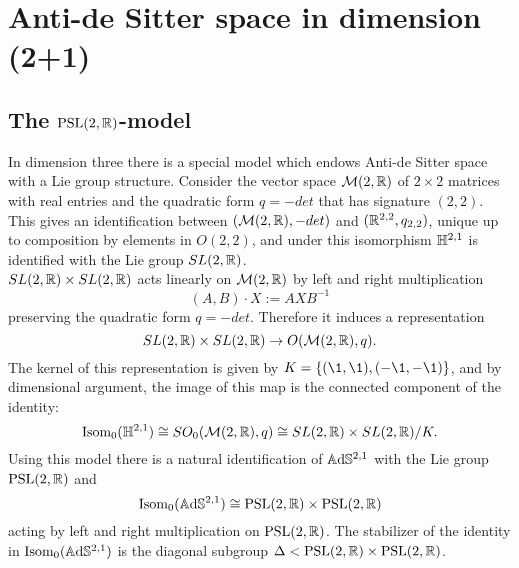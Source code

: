 \chapter{Anti-de Sitter space in dimension (2+1)} \label{chapter:3}

\section{The $\text{PSL}(2,\mathbb{R})$-model}
In dimension three there is a special model which endows Anti-de Sitter space with a Lie group structure.
Consider the vector space $\mathcal{M}(2,\mathbb{R})$ of $2 \times 2$ matrices with real entries and the quadratic form $q= -det$ that has signature $(2,2)$.
This gives an identification between $(\mathcal{M}(2,\mathbb{R}), -det)$ and $(\mathbb{R}^{2,2},q_{2,2})$, unique up to composition by elements in $O(2,2)$, and under this isomorphism $\mathbb{H}^{2,1}$ is identified with the Lie group $SL(2,\mathbb{R})$.\\
$SL(2,\mathbb{R})\times SL(2,\mathbb{R})$ acts linearly on $\mathcal{M}(2,\mathbb{R})$ by left and right multiplication
\[
    (A,B) \cdot X := AXB^{-1}    
\]
preserving the quadratic form $q = -det$. Therefore it induces a representation
\[
    SL(2,\mathbb{R})\times SL(2,\mathbb{R}) \to O(\mathcal{M}(2,\mathbb{R}),q).
\]
The kernel of this representation is given by $K=\{ (\1,\1),(-\1,-\1) \}$, and by dimensional argument, the image of this map is the connected component of the identity:
\[
    \text{Isom}_0(\mathbb{H}^{2,1}) \cong SO_0(\mathcal{M}(2,\mathbb{R}),q) \cong SL(2,\mathbb{R})\times SL(2,\mathbb{R}) / K.
\]
Using this model there is a natural identification of $\mathbb{A}\mathrm{d}\mathbb{S}^{2,1}$ with the Lie group $\text{PSL}(2,\mathbb{R})$ and
\[
    \text{Isom}_0(\mathbb{A}\mathrm{d}\mathbb{S}^{2,1}) \cong \text{PSL}(2,\mathbb{R}) \times \text{PSL}(2,\mathbb{R})
\]
acting by left and right multiplication on $\text{PSL}(2,\mathbb{R})$.
The stabilizer of the identity in $\text{Isom}_0(\mathbb{A}\mathrm{d}\mathbb{S}^{2,1})$ is the diagonal subgroup $\Delta < \text{PSL}(2,\mathbb{R}) \times \text{PSL}(2,\mathbb{R})$.\\

